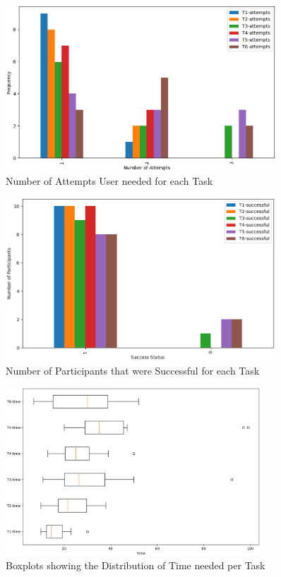 \begin{figure}[h]
    \centering
    \captionsetup{justification=centering}
    \includegraphics[width=0.9\textwidth]{graphics/task-attempts.png}
    \caption{Number of Attempts User needed for each Task}
    \label{fig:task-attempts}
\end{figure}
\begin{figure}[h]
    \centering
    \captionsetup{justification=centering}
    \includegraphics[width=0.9\textwidth]{graphics/task-success.png}
    \caption{Number of Participants that were Successful for each Task}
    \label{fig:task-success}
\end{figure}

\begin{figure}[h]
    \centering
    \captionsetup{justification=centering}
    \includegraphics[width=0.85\textwidth]{graphics/time-boxplots.png}
    \caption{Boxplots showing the Distribution of Time needed per Task}
    \label{fig:task-boxplots}
\end{figure}

